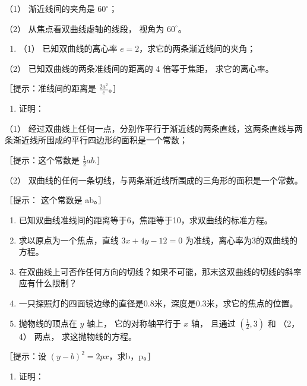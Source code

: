 （1） 渐近线间的夹角是 \(60^{\circ}\)；

（2） 从焦点看双曲线虚轴的线段， 视角为 \(60^{\circ}\)。

\begin{enumerate}
\def\labelenumi{\arabic{enumi}.}
\setcounter{enumi}{25}
\tightlist
\item
  （1） 已知双曲线的离心率 \(e = 2\)，求它的两条渐近线间的夹角；
\end{enumerate}

（2） 已知双曲线的两条准线间的距离的 4 倍等于焦距， 求它的离心率。

［提示：准线间的距离是 \(\frac{2a^2}{c}\)。］

\begin{enumerate}
\def\labelenumi{\arabic{enumi}.}
\setcounter{enumi}{26}
\tightlist
\item
  证明：
\end{enumerate}

（1）
经过双曲线上任何一点，分别作平行于渐近线的两条直线，这两条直线与两条渐近线所围成的平行四边形的面积是一个常数；

［提示：这个常数是 \(\frac{1}{2} ab.\)］

（2） 双曲线的任何一条切线，与两条渐近线所围成的三角形的面积是一个常数。

［提示： 这个常数是 ab。］

\begin{enumerate}
\def\labelenumi{\arabic{enumi}.}
\setcounter{enumi}{27}
\item
  已知双曲线准线间的距离等于6，焦距等于10，求双曲线的标准方程。
\item
  求以原点为一个焦点，直线 \(3x + 4y - 12 = 0\)
  为准线，离心率为3的双曲线的方程。
\item
  在双曲线上可否作任何方向的切线？如果不可能，那末这双曲线的切线的斜率应有什么限制？
\item
  一只探照灯的四面镜边缘的直径是0.8米，深度是0.3米，求它的焦点的位置。
\item
  抛物线的顶点在 \(y\) 轴上， 它的对称轴平行于 \(x\) 轴， 且通过
  \(\left(\frac{1}{2}, 3\right)\) 和 （2， 4） 两点， 求这抛物线的方程。
\end{enumerate}

［提示：设 \((y-b)^{2}=2px\)，求b，p。］

\begin{enumerate}
\def\labelenumi{\arabic{enumi}.}
\setcounter{enumi}{32}
\tightlist
\item
  证明：
\end{enumerate}

